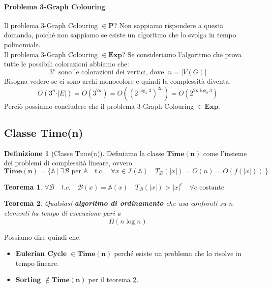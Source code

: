 \documentclass[a4paper]{article}
\newtheorem{thm}{Teorema}[subsection]
\theoremstyle{definition}
\newtheorem{definit}{Definizione}[subsection]
\newcommand{\Exp}{\mathbf{Exp}}
\newcommand{\p}{\mathbf{P}}
\newcommand{\tim}{\mathbf{Time(n)}}
\newcommand{\prob}[1]{\mathbb{#1}}
\newcommand{\instance}[1]{\mathcal{I}(\prob{#1})}
\newcommand{\alg}[1]{\mathcal{#1}}
\newcommand{\compl}[2]{T_\alg{#1}( \vert #2 \vert)}
\begin{document}
			\paragraph{Problema 3-Graph Colouring}
			Il problema 3-Graph Colouring $ \in \p $? Non sappiamo rispondere a questa domanda, poiché non sappiamo se esiste un algoritmo che lo svolga in tempo polinomiale.\\
			Il problema 3-Graph Colouring $ \in \Exp $? Se consideriamo l'algoritmo che prova tutte le possibili colorazioni abbiamo che:
			\[
				3^n \text{ sono le colorazioni dei vertici, dove }\ n = \vert V(G) \vert 
			\]
			Bisogna vedere se ci sono archi monocolore e quindi la complessità diventa:
			\[
				O(3^n\cdot\vert E \vert) = O(3^{2n}) = O((2^{\log_2 3})^{2n}) = O(2^{2n\log_2 3})
			\]
			Perciò possiamo concludere che il problema 3-Graph Colouring $ \in \Exp $.
		
			\subsection{Classe Time(n)}
			
			\begin{definit}[Classe Time(n)]
				Definiamo la classe $ \tim $ come l'insieme dei problemi di complessità lineare, ovvero
				\[
					\tim = \big\lbrace \prob{A}\ \vert\ \exists \alg{B} \text{ per } \prob{A}\quad t.c.\quad
					\forall x \in \instance{A}\quad \compl{\alg{B}}{x} = O(n) = O(f(\vert x \vert))\ \big\rbrace  
				\]
			\end{definit}
			
			\begin{thm}
				$ \forall \alg{B}\quad t.c.\quad \alg{B}(x) = \prob{A}(x)\quad \compl{\alg{B}}{x} > \vert x \vert^c\quad \forall c\text{ costante} $
			\end{thm}
			
			\begin{thm}
				\label{thm:sort}
				Qualsiasi \textbf{algoritmo di ordinamento} che usa \textit{confronti} su $ n $ elementi ha tempo di esecuzione pari a
				\[
					\Omega(n\log n)
				\]
			\end{thm}
			
			\noindent
			Possiamo dire quindi che:
			\begin{itemize}
				\item \textbf{Eulerian Cycle} $ \in \tim $ perché esiste un problema che lo risolve in tempo lineare.
				\item \textbf{Sorting} $ \notin \tim $ per il teorema \ref{thm:sort}.
			\end{itemize}
			
\end{document}
